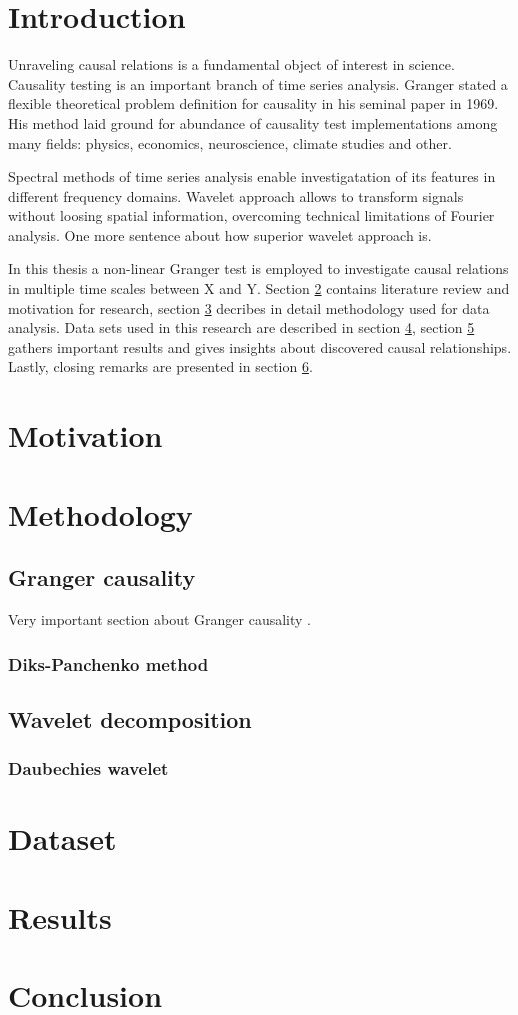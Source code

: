 \newpage

\section{Introduction}

Unraveling causal relations is a fundamental object of interest in science.
Causality testing is an important branch of time series analysis.
Granger \cite{granger69} stated a flexible theoretical problem definition for causality in his seminal paper in 1969.
His method laid ground for abundance of causality test implementations among many fields:
physics, economics, neuroscience, climate studies and other. 

Spectral methods of time series analysis enable investigatation of its features in different frequency domains.
Wavelet approach allows to transform signals without loosing spatial information, overcoming technical limitations of Fourier analysis.
One more sentence about how superior wavelet approach is.

In this thesis a non-linear Granger test is employed to investigate causal relations in multiple time scales between X and Y.
Section \ref{motivation} contains literature review and motivation for research,
section \ref{methodology} decribes in detail methodology used for data analysis.
Data sets used in this research are described in section \ref{data},
section \ref{results} gathers important results and gives insights about discovered causal relationships.
Lastly, closing remarks are presented in section \ref{conclusion}.

\section{Motivation} \label{motivation}

\section{Methodology} \label{methodology}
	\subsection{Granger causality}
Very important section about Granger causality \cite{granger69}.
		\subsubsection{Diks-Panchenko method}

	\subsection{Wavelet decomposition}
		\subsubsection{Daubechies wavelet}

\section{Dataset} \label{data}

\section{Results} \label{results}

\section{Conclusion} \label{conclusion}
